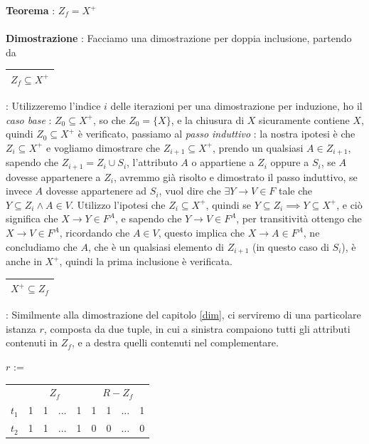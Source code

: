 \documentclass[12pt, letterpaper]{article}
\newcommand{\acc}{\\\hphantom{}\\}
\begin{document}
\textbf{Teorema} : \(Z_f=X^+\)\acc 
\textbf{Dimostrazione} : Facciamo una dimostrazione per doppia inclusione, partendo da 
\begin{tabular}{|c|}\hline \(Z_f\subseteq X^+\) \\ \hline\end{tabular} : Utilizzeremo l'indice \(i\) delle iterazioni 
per una dimostrazione per induzione, ho il \textit{caso base }: \(Z_0\subseteq X^+\), so che \(Z_0=\{X\}\), e la chiusura 
di \(X\) sicuramente contiene \(X\), quindi \(Z_0\subseteq X^+\) è verificato, passiamo al 
\textit{passo induttivo} : la nostra ipotesi è che \(Z_i\subseteq X^+\) e vogliamo dimostrare che \(Z_{i+1}\subseteq X^+\), 
prendo un qualsiasi \(A\in Z_{i+1}\), sapendo che \(Z_{i+1}=Z_i\cup S_i\), l'attributo \(A\) o appartiene a \(Z_i\)
oppure a \(S_i\), se \(A\) dovesse appartenere a \(Z_i\), avremmo già risolto e dimostrato il passo induttivo, se invece \(A\) 
dovesse appartenere ad \(S_i\), vuol dire che \(\exists Y\rightarrow V\in F\) tale che \(Y\subseteq Z_i\land A\in V\). 
Utilizzo l'ipotesi che \(Z_i\subseteq X^+\), quindi se \(Y\subseteq Z_i\implies Y\subseteq X^+\), e ciò significa 
 che \(X\rightarrow Y\in F^A\), e sapendo che \(Y\rightarrow V\in F^A\), per transitività ottengo che \(X\rightarrow V\in F^A\), 
 ricordando che \(A\in V\), questo implica che \(X\rightarrow A \in F^A\), ne concludiamo che \(A\), che è un qualsiasi 
 elemento di \(Z_{i+1}\) (in questo caso di \(S_i\)), è anche in \( X^+\), quindi la prima inclusione è verificata.\\
 \begin{tabular}{|c|}\hline \(X^+\subseteq Z_f\) \\ \hline\end{tabular} : Similmente alla dimostrazione del capitolo \ref{dim}, 
 ci serviremo di una particolare istanza \(r\), composta da due tuple, in cui a sinistra compaiono tutti gli attributi contenuti in 
 \(Z_f\), e a destra quelli contenuti nel complementare. \begin{center}
    \(r\) := \begin{tabular}{c|cccc|cccc|}
        \cline{2-9}
           & \multicolumn{4}{c|}{\(Z_f\)}                                                      & \multicolumn{4}{c|}{\(R-Z_f\)}                                                    \\ \cline{2-9} 
        \(t_1\) & \multicolumn{1}{c|}{1} & \multicolumn{1}{c|}{1} & \multicolumn{1}{c|}{\(\dots\)} & 1 & \multicolumn{1}{c|}{1} & \multicolumn{1}{c|}{1} & \multicolumn{1}{c|}{\(\dots\)} & 1 \\ \cline{2-9} 
        \(t_2\) & \multicolumn{1}{c|}{1} & \multicolumn{1}{c|}{1} & \multicolumn{1}{c|}{\(\dots\)} & 1 & \multicolumn{1}{c|}{0} & \multicolumn{1}{c|}{0} & \multicolumn{1}{c|}{\(\dots\)} & 0 \\ \cline{2-9} 
        \end{tabular}
 \end{center}
\end{document}
